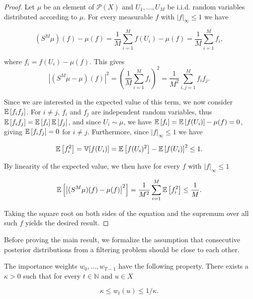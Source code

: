 \begin{proof}
  Let $\mu$ be an element of $\mathcal{P}(X)$ and $U_1, \ldots, U_M$ be i.i.d. random variables distributed according to $\mu$. For every measurable $f$ with $|f|_\infty \le 1$ we have 
  
  \begin{equation*}
    (S^M\mu)(f) - \mu(f) = \frac1{M}\sum_{i=1}^Mf(U_i) - \mu(f) = \frac1{M}\sum_{i=1}^Mf_i,
  \end{equation*}

  where $f_i = f(U_i) - \mu(f)$. This gives
  \begin{equation*}
    \left|(S^M\mu - \mu)(f)\right|^2
    = \left(\frac1{M}\sum_{i=1}^Mf_i\right)^2
    = \frac1{M^2}\sum_{i,j=1}^Mf_if_j.
  \end{equation*}

  Since we are interested in the expected value of this term, we now consider $\mathbb{E}\left[f_if_j\right]$. For $i \neq j$, $f_i$ and $f_j$ are independent random variables, thus $\mathbb{E}\left[f_if_j\right] = \mathbb{E}\left[f_i\right]\mathbb{E}\left[f_j\right]$, and since $U_i \sim \mu$, we have $\mathbb{E}\left[f_i\right] = \mathbb{E}\left[f(U_i)\right] - \mu(f) = 0$, giving $\mathbb{E}\left[f_if_j\right] = 0$ for $i \neq j$. Furthermore, since $|f|_\infty \le 1$ we have

  \begin{equation*}
    \mathbb{E}\left[f_i^2\right] = \mathbb{V}[f(U_i)] = \mathbb{E}\left[f(U_i)^2\right] - \mathbb{E}\left[f(U_i)\right]^2 \leq 1.
  \end{equation*}

  By linearity of the expected value, we then have for every $f$ with $|f|_\infty \le 1$

  \begin{equation*}
    \mathbb{E}\left[\left|(S^M\mu)(f) - \mu(f)\right|^2\right] = \frac1{M^2}\sum_{i=1}^M\mathbb{E}\left[f_i^2\right] \le \frac1{M}.
  \end{equation*}

  Taking the square root on both sides of the equation and the supremum over all such $f$ yields the desired result.
\end{proof}

Before proving the main result, we formalize the assumption that consecutive posterior distributions from a filtering problem should be close to each other.

\begin{assumption}\label{kappa-assumption}
  The importance weights $w_0, \ldots, w_{T-1}$ have the following property. There exists a $\kappa > 0$ such that for every $t \in \mathbb{N}$ and $u \in X$

  \begin{equation*}
    \kappa \leq w_t(u) \leq 1/\kappa.
  \end{equation*}
\end{assumption}


